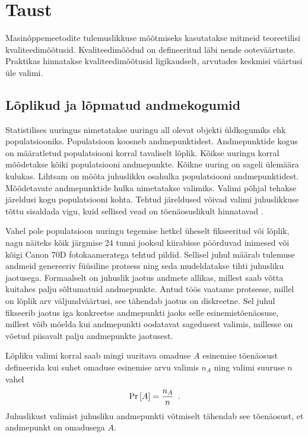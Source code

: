 \section{Taust}
Masinõppemeetodite tulemuslikkuse mõõtmiseks kasutatakse mitmeid teoreetilisi kvaliteedimõõtusid.
Kvaliteedimõõdud on defineeritud läbi nende ooteväärtuste. Praktikas hinnatakse kvaliteedimõõtusid ligikaudselt, arvutades keskmisi väärtusi üle valimi.

\subsection{Lõplikud ja lõpmatud andmekogumid}
Statistilises uuringus nimetatakse uuringu all olevat objekti üldkogumiks ehk populatsiooniks.
Populatsioon koosneb andmepunktidest. Andmepunktide kogus on määratletud populatsiooni korral tavaliselt lõplik. Kõikse uuringu korral mõõdetakse kõiki populatsiooni andmepunkte. Kõikne uuring on sageli ülemäära kulukas. Lihtsam on mõõta juhuslikku osahulka populatsiooni andmepunktidest. Mõõdetavate andmepunktide hulka nimetatakse valimiks. Valimi põhjal tehakse järeldusi kogu populatsiooni kohta. Tehtud järeldused võivad valimi juhuslikkuse tõttu sisaldada vigu, kuid sellised vead on tõenäosuslikult hinnatavad \cite{rakendusstatisika-algkursus}.

Vahel pole populatsioon uuringu tegemise hetkel üheselt fikseeritud või lõplik, nagu näiteks kõik järgmise 24 tunni jooksul kiirabisse pöörduvad inimesed või kõigi Canon 70D fotokaameratega tehtud pildid. Sellisel juhul määrab tulemuse andmeid genereeriv füüsiline protsess ning seda mudeldatakse tihti juhusliku jaotusega. Formaalselt on juhuslik jaotus andmete allikas, millest saab võtta kuitahes palju sõltumatuid andmepunkte. Antud töös vaatame protsesse, millel on lõplik arv väljundväärtusi, see tähendab jaotus on diskreetne. Sel juhul fikseerib jaotus iga konkreetse andmepunkti jaoks selle esinemistõenäosuse, millest võib mõelda kui andmepunkti oodatavat sagedusest valimis, millesse on võetud piisavalt palju andmepunkte jaotusest. 

Lõpliku valimi korral saab mingi uuritava omaduse $A$ esinemise tõenäosust defineerida kui suhet omaduse esinemise arvu valimis $n_A$ ning valimi suuruse $n$ vahel
\begin{equation*}
    \Pr\left[A\right]=\frac{n_A}{n} \enspace.
\end{equation*}
Juhuslikust valimist juhusliku andmepunkti võtmiselt tähendab see tõenäosust, et andmepunkt on omadusega $A$.

